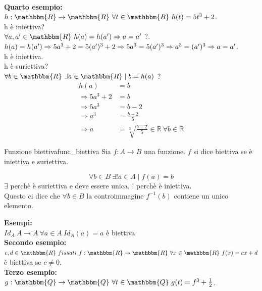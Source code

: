 \documentclass[12pt, letterpaper]{report}
\newcounter{definition}
\newcommand{\nmu}{}
\begin{document}
	\\
	\textbf{Quarto esempio: }
	\\
	$h: \mathbbm{R} \to \mathbbm{R} \ \forall t \in \mathbbm{R} \ h(t) = 5t^3 + 2$.
	\\
	h è iniettiva?
	\\
	$\forall a, a' \in \mathbbm{R} \ h(a) = h(a') \Rightarrow a = a'$ ?.
	\\
	$h(a) = h(a') \\ \Rightarrow 5a^3 + 2 = 5(a')^3 + 2 \\ \Rightarrow 5a^3 = 5(a')^3 \\ \Rightarrow a^3 = (a')^3 \\ \Rightarrow a = a'$.
	\\
	h è iniettiva.
	\\
	h è suriettiva?
	\\
	$\forall b \in \mathbbm{R} \ \exists a \in \mathbbm{R} \mid b = h(a)$ ?
	\begin{align*}
		h(a) &= b \\
		\Rightarrow 5a^3 + 2 &= b \\
		\Rightarrow 5a^3 &= b - 2 \\
		\Rightarrow a^3 &= \frac{b - 2}{5} \\
		\Rightarrow a &= \sqrt[3]{\frac{b-2}{5}} \in \mathbb{R} \ \forall b \in \mathbb{R}
	\end{align*}
	\begin{definition}{\nmu Funzione biettiva}{func_biettiva}
		Sia $f: A \to B$ una funzione. $f$ si dice biettiva se è iniettiva e suriettiva.

		\[
		\forall b \in B \ \exists! a \in A \mid f(a) = b
		\]
		$\exists$ perchè è suriettiva e deve essere unica, $!$ perchè è iniettiva.
		\\
		Questo ci dice che $\forall b \in B$ la controimmagine $f^{-1}(b)$ contiene un unico elemento.
	\end{definition}
	\textbf{Esempi: }
	\\
	$Id_A \ A \to A \ \forall a \in A \ Id_A(a) = a$ è biettiva
	\\
	\textbf{Secondo esempio:}
	\\
	$c,d \in \mathbbm{R} \ fissati \ f: \mathbbm{R} \to \mathbbm{R} \ \forall x \in \mathbbm{R} \ f(x) = cx + d$ è biettiva se $c \neq 0$.
	\\
	\textbf{Terzo esempio:}
	\\
	$g: \mathbbm{Q} \to \mathbbm{Q} \ \forall t \in \mathbbm{Q} \ g(t) = f^3 + \frac{1}{2}$.
	\\
\end{document}
